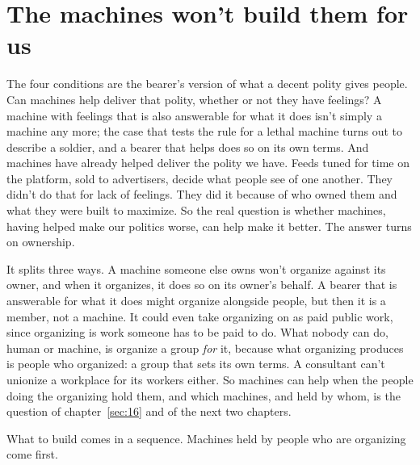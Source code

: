 \section{The machines won't build them for us}
\label{sec:25.5}
The four conditions are the bearer's version of what a decent polity gives people. Can machines help deliver that polity, whether or not they have feelings? A machine with feelings that is also answerable for what it does isn't simply a machine any more; the case that tests the rule for a lethal machine turns out to describe a soldier, and a bearer that helps does so on its own terms. And machines have already helped deliver the polity we have. Feeds tuned for time on the platform, sold to advertisers, decide what people see of one another. They didn't do that for lack of feelings. They did it because of who owned them and what they were built to maximize. So the real question is whether machines, having helped make our politics worse, can help make it better. The answer turns on ownership.

It splits three ways. A machine someone else owns won't organize against its owner, and when it organizes, it does so on its owner's behalf.
A bearer that is answerable for what it does might organize alongside people, but then it is a member, not a machine. It could even take organizing on as paid public work, since organizing is work someone has to be paid to do. What nobody can do, human or machine, is organize a group \emph{for} it, because what organizing produces is people who organized: a group that sets its own terms. A consultant can't unionize a workplace for its workers either. So machines can help when the people doing the organizing hold them, and which machines, and held by whom, is the question of chapter~\ref{sec:16} and of the next two chapters.

What to build comes in a sequence. Machines held by people who are organizing come first.

